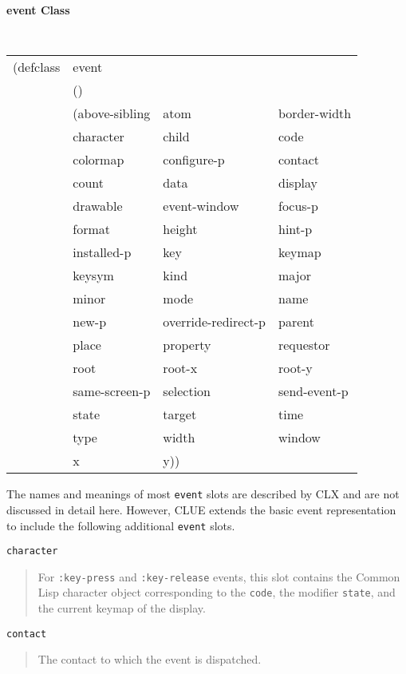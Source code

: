 \documentclass[twoside]{book}
\begin{document}
\begin{sloppy}
\pagebreak
{\samepage
{\large {\bf event \hfill Class}} 
\begin{flushright} \parbox[t]{6.125in}{
\tt
\begin{tabular}{llll}
\raggedright
(defclass & event & \\ 
&()\\
&(above-sibling & atom & border-width\\
&character & child & code\\
&colormap & configure-p & contact\\
&count & data & display\\
&drawable & event-window & focus-p\\
&format & height & hint-p\\
&installed-p & key & keymap \\
& keysym &kind & major \\
& minor &mode & name \\
& new-p &override-redirect-p & parent \\
& place &property & requestor \\
& root &root-x & root-y \\
& same-screen-p &selection & send-event-p \\
& state &target & time \\
&type  & width & window \\
& x  & y)) 									     
\end{tabular}
\rm

}\end{flushright}}

The names and meanings of most {\tt event} slots are described by CLX\cite{clx}
and are not discussed in detail here. However, CLUE extends the basic event
representation to include the following  additional {\tt event} slots.

\begin{flushright} \parbox[t]{6.125in}{
{\tt character}
\begin{quote}
For {\tt :key-press} and {\tt :key-release} events, this slot contains the Common
Lisp character
object corresponding to the {\tt code}, the modifier {\tt state}, and the
current keymap of the display.
\end{quote}

}\end{flushright}

\begin{flushright} \parbox[t]{6.125in}{
{\tt contact}
\begin{quote}
The contact to which the event is dispatched.
\end{quote}

}
\end{flushright}
\end{sloppy}
\end{document}
